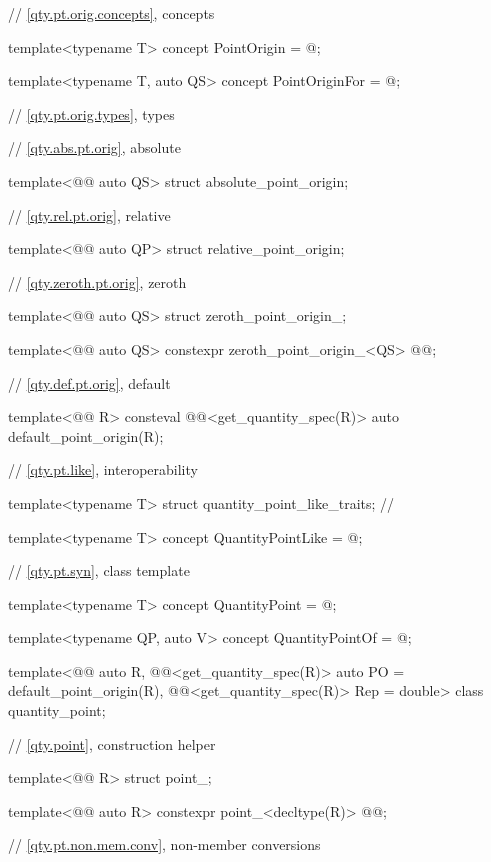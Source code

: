 \begin{codeblock}
{// \ref{qty.pt.orig.concepts}, concepts

template<typename T>
concept PointOrigin = @\seebelownc@;

template<typename T, auto QS>
concept PointOriginFor = @\seebelownc@;

// \ref{qty.pt.orig.types}, types

// \ref{qty.abs.pt.orig}, absolute

template<@@ auto QS>
struct absolute_point_origin;

// \ref{qty.rel.pt.orig}, relative

template<@@ auto QP>
struct relative_point_origin;

// \ref{qty.zeroth.pt.orig}, zeroth

template<@@ auto QS>
struct zeroth_point_origin_;

template<@@ auto QS>
constexpr zeroth_point_origin_<QS> @@{};

// \ref{qty.def.pt.orig}, default

template<@@ R>
consteval @@<get_quantity_spec(R{})> auto default_point_origin(R);

// \ref{qty.pt.like}, interoperability

template<typename T>
struct quantity_point_like_traits;  // \notdef

template<typename T>
concept QuantityPointLike = @\seebelownc@;

// \ref{qty.pt.syn}, class template 

template<typename T>
concept QuantityPoint = @\seebelownc@;

template<typename QP, auto V>
concept QuantityPointOf = @\seebelownc@;

template<@@ auto R,
         @@<get_quantity_spec(R)> auto PO = default_point_origin(R),
         @@<get_quantity_spec(R)> Rep = double>
class quantity_point;

// \ref{qty.point}, construction helper 

template<@@ R>
struct point_;

template<@@ auto R>
constexpr point_<decltype(R)> @@{};

// \ref{qty.pt.non.mem.conv}, non-member conversions

}
\end{codeblock}
